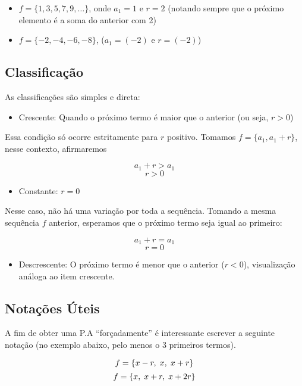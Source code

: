 \documentclass[12pt]{article}
\begin{document}
\begin{itemize}
        \item $f = \{1, 3, 5, 7, 9, \dots\}$, onde $a_{1} = 1$ e $r = 2$ (notando sempre que o próximo elemento é a soma do anterior com 2)

        \item $f = \{-2, -4, -6, -8\}$, ($a_{1} = (-2)$ e $r = (-2)$)
\end{itemize}

\subsection{Classificação}

As classificações são simples e direta:

\begin{itemize}
        \item Crescente: Quando o próximo termo é maior que o anterior (ou seja, $r > 0$)
\end{itemize}

Essa condição só ocorre estritamente para $r$ positivo. Tomamos $f = \{a_{1}, a_{1} + r\}$, nesse contexto, afirmaremos

\[a_{1} + r > a_{1}\]
\[r > 0\]

\begin{itemize}
  \item Constante: $r = 0$
\end{itemize}

Nesse caso, não há uma variação por toda a sequência. Tomando a mesma sequência $f$ anterior, esperamos que o próximo termo seja igual ao primeiro:

\[a_{1} + r = a_{1}\]
\[r = 0\]

\begin{itemize}
  \item Descrescente: O próximo termo é menor que o anterior ($r < 0$), visualização análoga ao item crescente.
\end{itemize}

\subsection{Notações Úteis}

A fim de obter uma P.A ``forçadamente'' é interessante escrever a seguinte notação (no exemplo abaixo, pelo menos o 3 primeiros termos).

\[f = \{x - r,\hspace{0.1cm} x,\hspace{0.1cm} x + r\}\]
\[f = \{x,\hspace{0.1cm} x + r,\hspace{0.1cm} x + 2r\}\]
\end{document}
